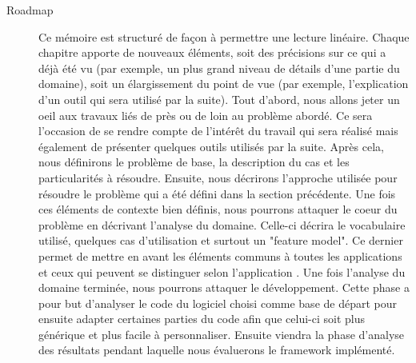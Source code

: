 \begin{description}
\item[Roadmap] 

Ce mémoire est structuré de façon à permettre une lecture linéaire.  Chaque chapitre apporte de nouveaux éléments,  soit des précisions sur ce qui a déjà été vu (par exemple,  un plus grand niveau de détails d'une partie du domaine),  soit un élargissement du point de vue (par exemple,  l'explication d'un outil qui sera utilisé par la suite).  Tout d'abord,  nous allons jeter un oeil aux travaux liés de près ou de loin au problème abordé.  Ce sera l'occasion de se rendre compte de l'intérêt du travail qui sera réalisé mais également de présenter quelques outils utilisés par la suite.  Après cela,  nous définirons le problème de base,  la description du cas et les particularités à résoudre.  Ensuite,  nous décrirons l'approche utilisée pour résoudre le problème qui a été défini dans la section précédente.  Une fois ces éléments de contexte bien définis,  nous pourrons attaquer le coeur du problème en décrivant l'analyse du domaine.  Celle-ci décrira le vocabulaire utilisé,  quelques cas d'utilisation et surtout un "feature model".  Ce dernier permet de mettre en avant les éléments communs à toutes les applications et ceux qui peuvent se distinguer selon l'application \cite{GenProg}.  Une fois l'analyse du domaine terminée,  nous pourrons attaquer le développement.  Cette phase a pour but d'analyser le code du logiciel choisi comme base de départ pour ensuite adapter certaines parties du code afin que celui-ci soit plus générique et plus facile à personnaliser.  Ensuite viendra la phase d'analyse des résultats pendant laquelle nous évaluerons le framework implémenté.

\end{description}